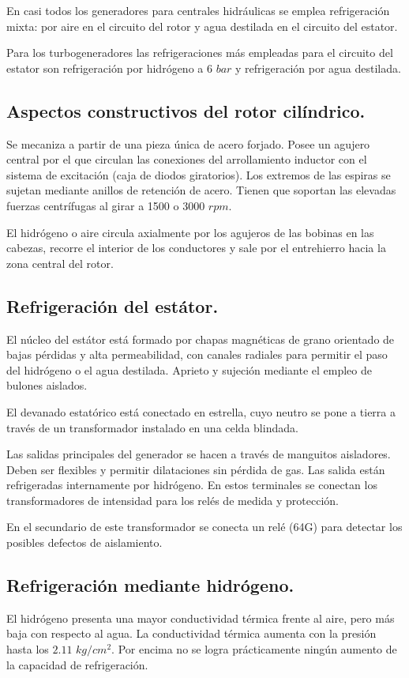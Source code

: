 			
			En casi todos los generadores para centrales hidráulicas se emplea refrigeración mixta: por
			aire en el circuito del rotor y agua destilada en el circuito del estator.
			
			
			Para los turbogeneradores las refrigeraciones más empleadas para el circuito del estator son refrigeración por hidrógeno a 6 $bar$ y refrigeración por agua destilada.
			
		\subsection{Aspectos constructivos del rotor cilíndrico.}
			Se mecaniza a partir de una pieza única de acero forjado. Posee un agujero central por el que circulan las conexiones del arrollamiento inductor con el sistema de excitación (caja de diodos giratorios). Los extremos de las espiras se sujetan mediante anillos de retención de acero. Tienen que soportan las elevadas fuerzas centrífugas al girar a 1500 o 3000 $rpm$. 
			
			
			El hidrógeno o aire circula axialmente por los agujeros de las bobinas en las cabezas, recorre el interior de los conductores y sale por el entrehierro hacia la zona central del rotor.
			
		\subsection{Refrigeración del estátor.}
			El núcleo del estátor está formado por chapas magnéticas de grano orientado de bajas pérdidas y alta permeabilidad, con canales radiales para permitir el paso del hidrógeno o el agua destilada. Aprieto y sujeción
			mediante el empleo de bulones aislados.
			
			
			El devanado estatórico está conectado en estrella, cuyo neutro se pone a tierra a través de un transformador instalado en una celda blindada. 
			
			
			Las salidas principales del generador se hacen a través de manguitos aisladores. Deben ser flexibles y permitir dilataciones sin pérdida de gas. Las salida están refrigeradas internamente por hidrógeno. En estos terminales se conectan los transformadores de intensidad para los relés de medida y protección.
			
			
			En el secundario de este transformador se conecta un relé (64G) para detectar los posibles defectos de aislamiento.
			
		\subsection{Refrigeración mediante hidrógeno.}
			El hidrógeno presenta una mayor conductividad térmica frente al aire, pero más baja con respecto al agua. La conductividad térmica aumenta con la presión hasta los $2.11$ $kg/cm^2$. Por encima no se logra prácticamente ningún aumento de la capacidad de refrigeración.
			
